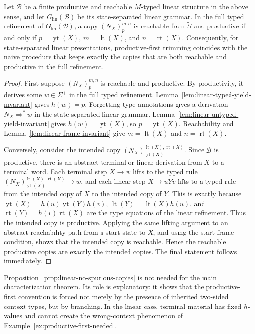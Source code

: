 \documentclass[sub]{jalc}
\newcommand{\yt}{\operatorname{yt}}
\newcommand{\lt}{\operatorname{lt}}
\newcommand{\rt}{\operatorname{rt}}
\begin{document}
\begin{proposition}
\label{prop:linear-no-spurious-copies}
Let \(\mathcal B\) be a finite productive and reachable \(M\)-typed linear structure in the above sense, and let \(G_{\mathrm{lin}}(\mathcal B)\) be its state-separated linear grammar. In the full typed refinement of \(G_{\mathrm{lin}}(\mathcal B)\), a copy \((N_X)_p^{m,n}\) is reachable from \(\widetilde S\) and productive if and only if \(p=\yt(X)\), \(m=\lt(X)\), and \(n=\rt(X)\). Consequently, for state-separated linear presentations, productive-first trimming coincides with the naive procedure that keeps exactly the copies that are both reachable and productive in the full refinement.
\end{proposition}

\begin{proof}
First suppose \((N_X)_p^{m,n}\) is reachable and productive. By productivity, it derives some \(w\in\Sigma^+\) in the full typed refinement. Lemma~\ref{lem:linear-typed-yield-invariant} gives \(h(w)=p\). Forgetting type annotations gives a derivation \(N_X\Rightarrow^*w\) in the state-separated linear grammar. Lemma~\ref{lem:linear-untyped-yield-invariant} gives \(h(w)=\yt(X)\), so \(p=\yt(X)\). Reachability and Lemma~\ref{lem:linear-frame-invariant} give \(m=\lt(X)\) and \(n=\rt(X)\).

Conversely, consider the intended copy \((N_X)_{\yt(X)}^{\lt(X),\rt(X)}\). Since \(\mathcal B\) is productive, there is an abstract terminal or linear derivation from \(X\) to a terminal word. Each terminal step \(X\to w\) lifts to the typed rule \((N_X)_{\yt(X)}^{\lt(X),\rt(X)}\to w\), and each linear step \(X\to uYv\) lifts to a typed rule from the intended copy of \(X\) to the intended copy of \(Y\). This is exactly because \(\yt(X)=h(u)\yt(Y)h(v)\), \(\lt(Y)=\lt(X)h(u)\), and \(\rt(Y)=h(v)\rt(X)\) are the type equations of the linear refinement. Thus the intended copy is productive. Applying the same lifting argument to an abstract reachability path from a start state to \(X\), and using the start-frame condition, shows that the intended copy is reachable. Hence the reachable productive copies are exactly the intended copies. The final statement follows immediately.
\end{proof}

\begin{remark}
Proposition~\ref{prop:linear-no-spurious-copies} is not needed for the main characterization theorem. Its role is explanatory: it shows that the productive-first convention is forced not merely by the presence of inherited two-sided context types, but by branching. In the linear case, terminal material has fixed \(h\)-values and cannot create the wrong-context phenomenon of Example~\ref{ex:productive-first-needed}.
\end{remark}
\end{document}
